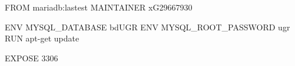 FROM mariadb:lastest
MAINTAINER xG29667930

ENV MYSQL_DATABASE bdUGR
ENV MYSQL_ROOT_PASSWORD ugr    
RUN apt-get update

EXPOSE 3306